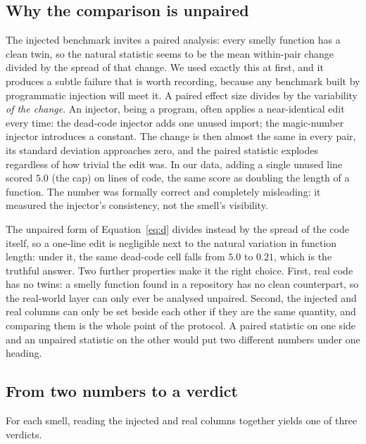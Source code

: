 \documentclass[10pt,a4paper,twocolumn]{article}
\begin{document}
\subsection{Why the comparison is unpaired}
\label{sec:unpaired}

The injected benchmark invites a paired analysis: every smelly function has a
clean twin, so the natural statistic seems to be the mean within-pair change
divided by the spread of that change. We used exactly this at first, and it
produces a subtle failure that is worth recording, because any benchmark built
by programmatic injection will meet it. A paired effect size divides by the
variability \emph{of the change}. An injector, being a program, often applies a
near-identical edit every time: the dead-code injector adds one unused import;
the magic-number injector introduces a constant. The change is then almost the
same in every pair, its standard deviation approaches zero, and the paired
statistic explodes regardless of how trivial the edit was. In our data, adding a
single unused line scored $5.0$ (the cap) on lines of code, the same score as
doubling the length of a function. The number was formally correct and
completely misleading: it measured the injector's consistency, not the smell's
visibility.

The unpaired form of Equation~\ref{eq:d} divides instead by the spread of the
code itself, so a one-line edit is negligible next to the natural variation in
function length: under it, the same dead-code cell falls from $5.0$ to $0.21$, which
is the truthful answer. Two further properties make it the right choice. First,
real code has no twins: a smelly function found in a repository has no clean
counterpart, so the real-world layer can only ever be analysed unpaired. Second,
the injected and real columns can only be set beside each other if they are the
same quantity, and comparing them is the whole point of the protocol. A paired
statistic on one side and an unpaired statistic on the other would put two
different numbers under one heading.

\subsection{From two numbers to a verdict}
\label{sec:verdicts}

For each smell, reading the injected and real columns together yields one of
three verdicts.
\end{document}
